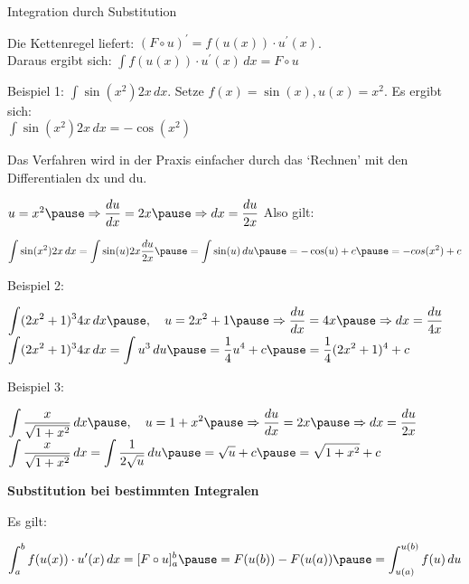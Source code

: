 \begin{frame}[fragile]
 Integration durch Substitution  
  
Die Kettenregel liefert: $(F \circ u)^{\prime} = f(u(x)) \cdot u^{\prime}(x)$. \\ Daraus ergibt sich: 
  $\displaystyle\int   f(u(x)) \cdot u^{\prime}(x) \,dx = F \circ u$ \pause

Beispiel 1: $\displaystyle\int \sin(x^2)  2x \,dx$. \pause Setze $f(x)= \sin(x), u(x) = x^2$. \pause
Es ergibt sich: \\  $\displaystyle\int \sin(x^2)  2x \,dx = -\cos(x^2)$ \pause

Das Verfahren wird in der Praxis einfacher durch das `Rechnen' mit den Differentialen dx und du. \pause

$u = x^2 \pause \Rightarrow \dfrac{du}{dx} = 2x  \pause \Rightarrow dx = \dfrac{du}{2x}$ \pause Also gilt:

$\displaystyle\int \sin(x^2)  2x \,dx = \displaystyle\int \sin(u)  2x  \dfrac{du}{2x}\pause = \displaystyle\int \sin(u) \,du \pause = -\cos(u) +c \pause = -cos(x^2)+c$
\end{frame}

\begin{frame}[fragile]
Beispiel 2:
  
$\displaystyle\int (2x^2+1)^3 4x\,dx \pause, \quad u = 2x^2+1 \pause \Rightarrow  \dfrac{du}{dx} =4x \pause \Rightarrow dx = \dfrac{du}{4x}$ \pause
$\displaystyle\int (2x^2+1)^3 4x\,dx = \int u^3 \,du \pause = \frac{1}{4}u^4+c \pause =  \frac{1}{4}(2x^2+1)^4+c $ \pause
 
Beispiel 3:

$\displaystyle\int \dfrac{x}{\sqrt{1+x^2}}\,dx \pause, \quad u = 1+x^2 \pause \Rightarrow  \dfrac{du}{dx} =2x \pause \Rightarrow dx = \dfrac{du}{2x}$ \pause
$\displaystyle\int \dfrac{x}{\sqrt{1+x^2}}\,dx  = \int \dfrac{1}{2\sqrt{u}}\,du \pause = \sqrt{u} + c \pause = \sqrt{1+x^2}+c$
 
\end{frame}

\begin{frame}[fragile]
\textbf{Substitution bei bestimmten Integralen}

Es gilt:
  
 $\displaystyle\int_a^b f(u(x)) \cdot u^{\prime}(x) \,dx = [F \circ u]_a^b \pause =F(u(b))-F(u(a)) \pause = \displaystyle\int_{u(a)}^{u(b)} f(u) \,du$
 
 \end{frame}

